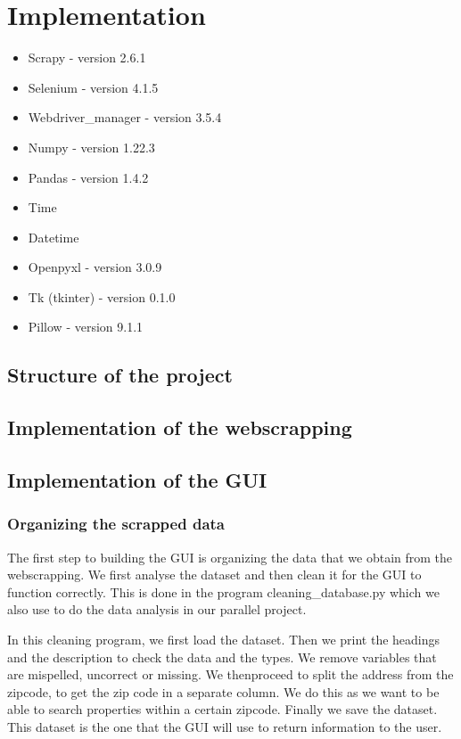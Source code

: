 \documentclass[main]{subfiles}
\begin{document}
\section{Implementation}
\begin{itemize}
    \item Scrapy -  version 2.6.1
    \item Selenium - version 4.1.5
    \item Webdriver\_manager - version 3.5.4
    \item Numpy -  version 1.22.3
    \item Pandas  - version 1.4.2
    \item Time
    \item Datetime
    \item Openpyxl - version 3.0.9
    \item Tk (tkinter) - version 0.1.0
    \item Pillow - version 9.1.1
\end{itemize}

\subsection{Structure of the project}

\subsection{Implementation of the webscrapping}

\subsection{Implementation of the GUI}

\subsubsection{Organizing the scrapped data}
The first step to building the GUI is organizing the data that we obtain from the webscrapping.
We first analyse the dataset and then clean it for the GUI to function correctly.
This is done in the program cleaning_database.py which we also use to do the data analysis in our parallel project. \par
In this cleaning program, we first load the dataset. 
Then we print the headings and the description to check the data and the types.
We remove variables that are mispelled, uncorrect or missing. 
We thenproceed to split the address from the zipcode, to get the zip code in a separate column. 
We do this as we want to be able to search properties within a certain zipcode. 
Finally we save the dataset. This dataset is the one that the GUI will use to return information to the user.
\end{document}
